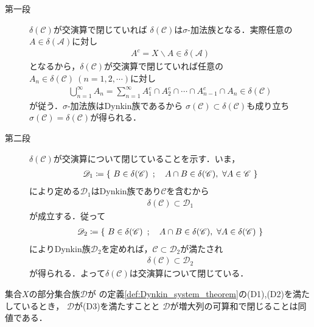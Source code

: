 	\begin{prf}\mbox{}
		\begin{description}
			\item[第一段]
				$\delta(\mathscr{C})$が交演算で閉じていれば
				$\delta(\mathscr{C})$は$\sigma$-加法族となる．実際任意の$A \in \delta(\mathscr{A})$に対し
				\begin{align}
					A^c = X \backslash A \in \delta(\mathscr{A})
				\end{align}
				となるから，$\delta(\mathscr{C})$が交演算で閉じていれば任意の
				$A_n \in \delta(\mathscr{C})\ (n=1,2,\cdots)$に対し
				\begin{align}
					\bigcup_{n=1}^{\infty} A_n
					= \sum_{n=1}^{\infty} A_1^c \cap A_2^c \cap \cdots \cap A_{n-1}^c \cap A_n
					\in \delta(\mathscr{C})
				\end{align}
				が従う．$\sigma$-加法族はDynkin族であるから
				$\sigma(\mathscr{C}) \subset \delta(\mathscr{C})$も成り立ち
				$\sigma(\mathscr{C}) = \delta(\mathscr{C})$が得られる．
			
			\item[第二段]
				$\delta(\mathscr{C})$が交演算について閉じていることを示す．いま，
				\begin{align}
					\mathscr{D}_1 \coloneqq
					\Set{B \in \delta(\mathscr{C})}{ A \cap B \in \delta(\mathscr{C}),\ 
					\forall A \in \mathscr{C}}
				\end{align}
				により定める$\mathscr{D}_1$はDynkin族であり$\mathscr{C}$を含むから
				\begin{align}
					\delta(\mathscr{C}) \subset \mathscr{D}_1
				\end{align}
				が成立する．従って
				\begin{align}
					\mathscr{D}_2 \coloneqq
					\Set{B \in \delta(\mathscr{C})}{ A \cap B \in \delta(\mathscr{C}),\ 
					\forall A \in \delta(\mathscr{C})}
				\end{align}
				によりDynkin族$\mathscr{D}_2$を定めれば，$\mathscr{C} \subset \mathscr{D}_2$が満たされ
				\begin{align}
					\delta(\mathscr{C}) \subset \mathscr{D}_2
				\end{align}
				が得られる．よって$\delta(\mathscr{C})$は交演算について閉じている．
				\QED
		\end{description}
	\end{prf}
	
	\begin{screen}
		\begin{thm}
			集合$X$の部分集合族$\mathscr{D}$が
			の定義\ref{def:Dynkin_system_theorem}の(D1),(D2)を満たしているとき，
			$\mathscr{D}$が(D3)を満たすことと
			$\mathscr{D}$が増大列の可算和で閉じることは同値である．
		\end{thm}
	\end{screen}
	
